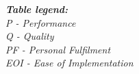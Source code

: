 \documentclass[final_report_innit.tex]{subfiles}
\begin{document}
\smallskip
\smallskip
\smallskip
\smallskip
\smallskip
\smallskip
\smallskip
\smallskip
\smallskip
\smallskip
\smallskip
\smallskip
\smallskip
\smallskip

\smallskip
\smallskip
\smallskip
\smallskip
\smallskip
\smallskip
\smallskip\smallskip
\smallskip
\smallskip
\smallskip
\smallskip
\smallskip
\smallskip\smallskip
\smallskip
\smallskip
\smallskip
\smallskip
\smallskip
\smallskip
\smallskip
\smallskip
\smallskip\smallskip
\smallskip
\smallskip\smallskip
\smallskip
\smallskip

\smallskip
\smallskip



\noindent
\textit{
\textbf{\hspace{12 mm}Table legend:}
\\
\hspace*{13 mm}P - Performance
\\
\hspace*{13 mm}Q - Quality
\\
\hspace*{13 mm}PF - Personal Fulfilment
\\
\hspace*{13 mm}EOI - Ease of Implementation
}
\end{document}
